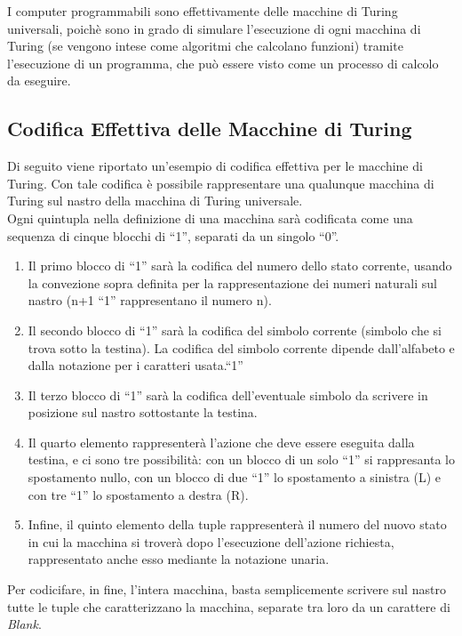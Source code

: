 I computer programmabili sono effettivamente delle macchine di Turing
universali, poich\`e sono in grado di simulare l'esecuzione di ogni
macchina di Turing (se vengono intese come algoritmi che calcolano
funzioni) tramite l'esecuzione di un programma, che pu\`o essere visto
come un processo di calcolo da eseguire.

\subsection{Codifica Effettiva delle Macchine di Turing}\label{codeffettiva}

Di seguito viene riportato un'esempio di codifica effettiva per le
macchine di Turing. Con tale codifica \`e possibile rappresentare una
qualunque macchina di Turing sul nastro della macchina di Turing
universale.\\

Ogni quintupla nella definizione di una macchina sar\`a codificata
come una sequenza di cinque blocchi di ``1'', separati da un singolo
``0''.
\begin{enumerate}
  \item Il primo blocco di ``1'' sar\`a la codifica del numero dello
    stato corrente, usando la convezione sopra definita per la
    rappresentazione dei numeri naturali sul nastro (n+1 ``1''
    rappresentano il numero n).
  \item Il secondo blocco di ``1'' sar\`a la codifica del simbolo
    corrente (simbolo che si trova sotto la testina). La codifica del
    simbolo corrente dipende dall'alfabeto e dalla notazione per i
    caratteri usata.``1''
  \item Il terzo blocco di ``1'' sar\`a la codifica dell'eventuale
    simbolo da scrivere in posizione sul nastro sottostante la
    testina.
  \item Il quarto elemento rappresenter\`a l'azione che deve essere
    eseguita dalla testina, e ci sono tre possibilit\`a: con un blocco
    di un solo ``1'' si rappresanta lo spostamento nullo, con un
    blocco di due ``1'' lo spostamento a sinistra (L) e con tre ``1''
    lo spostamento a destra (R).
  \item Infine, il quinto elemento della tuple rappresenter\`a il
    numero del nuovo stato in cui la macchina si trover\`a dopo
    l'esecuzione dell'azione richiesta, rappresentato anche esso
    mediante la notazione unaria.
\end{enumerate}

Per codicifare, in fine, l'intera macchina, basta semplicemente
scrivere sul nastro tutte le tuple che caratterizzano la macchina,
separate tra loro da un carattere di \textit{Blank}.

